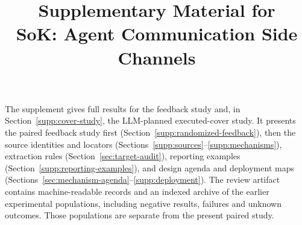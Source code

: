 \documentclass[conference,compsoc]{IEEEtran}
\title{Supplementary Material for\\SoK: Agent Communication Side Channels}
\author{}
\begin{document}

\raggedbottom
\pagestyle{plain}
\maketitle
\thispagestyle{plain}
\noindent The supplement gives full results for the feedback study and, in Section~\ref{supp:cover-study}, the LLM-planned executed-cover study. It presents the paired feedback study first (Section~\ref{supp:randomized-feedback}), then the source identities and locators (Sections~\ref{supp:sources}--\ref{supp:mechanisms}), extraction rules (Section~\ref{sec:target-audit}), reporting examples (Section~\ref{supp:reporting-examples}), and design agenda and deployment maps (Sections~\ref{sec:mechanism-agenda}--\ref{supp:deployment}). The review artifact contains machine-readable records and an indexed archive of the earlier experimental populations, including negative results, failures and unknown outcomes. Those populations are separate from the present paired study.

\clearpage\onecolumn\twocolumn







\clearpage\onecolumn\twocolumn


\end{document}

